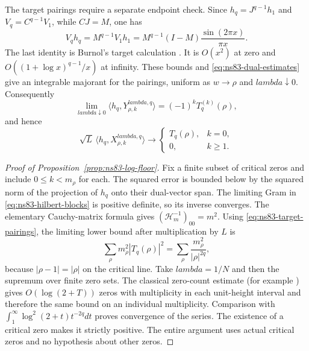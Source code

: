 \documentclass[11pt]{article}
\def\lambda{lambda}%
\theoremstyle{remark}
\begin{document}
The target pairings require a separate endpoint check. Since
$h_q=J^{q-1}h_1$ and $V_q=C^{q-1}V_1$, while $CJ=M$, one has
\[
 V_qh_q=M^{q-1}V_1h_1
       =M^{q-1}(I-M)\frac{\sin(2\pi x)}{\pi x}.
\]
The last identity is Burnol's target calculation
\cite[Theorem 5.4]{BurnolLower2002}. It is $O(x^2)$ at zero and
$O((1+\log x)^{q-1}/x)$ at infinity. These bounds and
\eqref{eq:ns83-dual-estimates} give an integrable majorant for the
pairings, uniform as $w\to\rho$ and $\lambda\downarrow0$.
Consequently
\[
 \lim_{\lambda\downarrow0}\langle h_q,Y^{\lambda,q}_{\rho,k}\rangle
       =(-1)^k T_q^{(k)}(\rho),
\]
and hence
\begin{equation}
 \sqrt L\,\langle h_q,X^{\lambda,q}_{\rho,k}\rangle
 \longrightarrow
 \begin{cases}T_q(\rho),&k=0,\\0,&k\geq1.\end{cases}
 \label{eq:ns83-target-pairings}
\end{equation}

\begin{proof}[Proof of Proposition~\ref{prop:ns83-log-floor}]
Fix a finite subset of critical zeros and include $0\leq k<m_\rho$
for each. The squared error is bounded below by the squared norm of the
projection of $h_q$ onto their dual-vector span. The limiting Gram in
\eqref{eq:ns83-hilbert-blocks} is positive definite, so its inverse
converges. The elementary Cauchy-matrix formula gives
$(\mathcal H_m^{-1})_{00}=m^2$. Using
\eqref{eq:ns83-target-pairings}, the limiting lower bound after
multiplication by $L$ is
\[
 \sum_\rho m_\rho^2|T_q(\rho)|^2
 =\sum_\rho\frac{m_\rho^2}{|\rho|^{2q}},
\]
because $|\rho-1|=|\rho|$ on the critical line.
Take $\lambda=1/N$ and then the supremum over finite zero sets.
The classical zero-count estimate (for example \cite{HasanalizadeShenWong2021}) gives $O(\log(2+T))$ zeros with
multiplicity in each unit-height interval and therefore the same bound
on an individual multiplicity. Comparison with
$\int_1^\infty \log^2(2+t)t^{-2q}dt$ proves convergence of the series.
The existence of a critical zero makes it strictly positive. The entire
argument uses actual critical zeros and no hypothesis about other zeros.
\end{proof}
\end{document}
